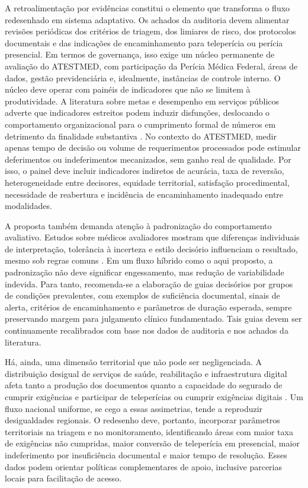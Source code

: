 \documentclass[12pt,a4paper]{article}
\begin{document}
A retroalimentação por evidências constitui o elemento que transforma o fluxo redesenhado em sistema adaptativo. Os achados da auditoria devem alimentar revisões periódicas dos critérios de triagem, dos limiares de risco, dos protocolos documentais e das indicações de encaminhamento para teleperícia ou perícia presencial. Em termos de governança, isso exige um núcleo permanente de avaliação do ATESTMED, com participação da Perícia Médica Federal, áreas de dados, gestão previdenciária e, idealmente, instâncias de controle interno. O núcleo deve operar com painéis de indicadores que não se limitem à produtividade. A literatura sobre metas e desempenho em serviços públicos adverte que indicadores estreitos podem induzir disfunções, deslocando o comportamento organizacional para o cumprimento formal de números em detrimento da finalidade substantiva \parencite{kelman2009performanceimprovementandperformancedysfunctionanemp}. No contexto do ATESTMED, medir apenas tempo de decisão ou volume de requerimentos processados pode estimular deferimentos ou indeferimentos mecanizados, sem ganho real de qualidade. Por isso, o painel deve incluir indicadores indiretos de acurácia, taxa de reversão, heterogeneidade entre decisores, equidade territorial, satisfação procedimental, necessidade de reabertura e incidência de encaminhamento inadequado entre modalidades.

A proposta também demanda atenção à padronização do comportamento avaliativo. Estudos sobre médicos avaliadores mostram que diferenças individuais de interpretação, tolerância à incerteza e estilo decisório influenciam o resultado, mesmo sob regras comuns \parencite{steenbeek2011thedevelopmentofinstrumentstomeasuretheworkdisa}. Em um fluxo híbrido como o aqui proposto, a padronização não deve significar engessamento, mas redução de variabilidade indevida. Para tanto, recomenda-se a elaboração de guias decisórios por grupos de condições prevalentes, com exemplos de suficiência documental, sinais de alerta, critérios de encaminhamento e parâmetros de duração esperada, sempre preservando margem para julgamento clínico fundamentado. Tais guias devem ser continuamente recalibrados com base nos dados de auditoria e nos achados da literatura.

Há, ainda, uma dimensão territorial que não pode ser negligenciada. A distribuição desigual de serviços de saúde, reabilitação e infraestrutura digital afeta tanto a produção dos documentos quanto a capacidade do segurado de cumprir exigências e participar de teleperícias ou cumprir exigências digitais \parencite{gao2019disabilityconcentrationandaccesstorehabilitationservice, mackett2025ametareviewofliteraturereviewsofdisabilitytravel}. Um fluxo nacional uniforme, se cego a essas assimetrias, tende a reproduzir desigualdades regionais. O redesenho deve, portanto, incorporar parâmetros territoriais na triagem e no monitoramento, identificando áreas com maior taxa de exigências não cumpridas, maior conversão de teleperícia em presencial, maior indeferimento por insuficiência documental e maior tempo de resolução. Esses dados podem orientar políticas complementares de apoio, inclusive parcerias locais para facilitação de acesso.
\end{document}
